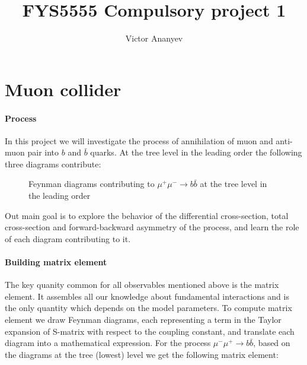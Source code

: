 \documentclass{article}
\title{FYS5555 Compulsory project 1}
\author{Victor Ananyev}
\begin{document}
\maketitle

\section{Muon collider}

\paragraph{Process} In this project we will investigate the process of annihilation of muon and anti-muon pair into $b$ and $\bar{b}$ quarks. At the tree level in the leading order the following three diagrams contribute:

\begin{figure}[h]
\centering
    \hfill%
    \hfill%
    \label{fig:tree-diags}
    \caption{Feynman diagrams contributing to $\mu^{+} \mu^{-} \rightarrow b \bar{b}$ at the tree level in the leading order}
\end{figure}

Out main goal is to explore the behavior of the differential cross-section, total cross-section and forward-backward asymmetry of the process, and learn the role of each diagram contributing to it.

\paragraph{Building matrix element} The key quanity common for all observables mentioned above is the matrix element. It assembles all our knowledge about fundamental interactions and is the only quantity which depends on the model parameters. To compute matrix element we draw Feynman diagrams, each representing a term in the Taylor expansion of S-matrix with respect to the coupling constant, and translate each diagram into a mathematical expression. For the process $\mu^{-} \mu^{+} \rightarrow b \bar{b}$, based on the diagrams at the tree (lowest) level we get the following matrix element:
\end{document}
